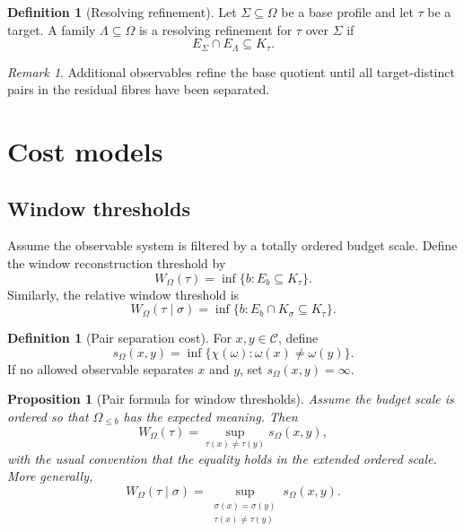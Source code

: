 \documentclass[11pt]{article}
\newtheorem{proposition}[theorem]{Proposition}
\theoremstyle{definition}
\newtheorem{definition}[theorem]{Definition}
\theoremstyle{remark}
\newtheorem{remark}[theorem]{Remark}
\begin{document}
\begin{definition}[Resolving refinement]
Let \(\Sigma\subseteq\Omega\) be a base profile and let \(\tau\) be a target.  A family \(\Lambda\subseteq\Omega\) is a resolving refinement for \(\tau\) over \(\Sigma\) if
\[
E_\Sigma\cap E_\Lambda\subseteq K_\tau.
\]
\end{definition}

\begin{remark}
Additional observables refine the base quotient until all target-distinct pairs in the residual fibres have been separated.
\end{remark}

\section{Cost models}

\subsection{Window thresholds}

Assume the observable system is filtered by a totally ordered budget scale.  Define the window reconstruction threshold by
\[
W_\Omega(\tau)=\inf\{b:E_b\subseteq K_\tau\}.
\]
Similarly, the relative window threshold is
\[
W_\Omega(\tau\mid\sigma)=\inf\{b:E_b\cap K_\sigma\subseteq K_\tau\}.
\]

\begin{definition}[Pair separation cost]
For \(x,y\in\mathcal C\), define
\[
s_\Omega(x,y)=\inf\{\chi(\omega):\omega(x)\neq\omega(y)\}.
\]
If no allowed observable separates \(x\) and \(y\), set \(s_\Omega(x,y)=\infty\).
\end{definition}

\begin{proposition}[Pair formula for window thresholds]
Assume the budget scale is ordered so that \(\Omega_{\leq b}\) has the expected meaning.  Then
\[
W_\Omega(\tau)
=
\sup_{\tau(x)\neq\tau(y)}s_\Omega(x,y),
\]
with the usual convention that the equality holds in the extended ordered scale.  More generally,
\[
W_\Omega(\tau\mid\sigma)
=
\sup_{\substack{\sigma(x)=\sigma(y)\\ \tau(x)\neq\tau(y)}}s_\Omega(x,y).
\]
\end{proposition}
\end{document}
